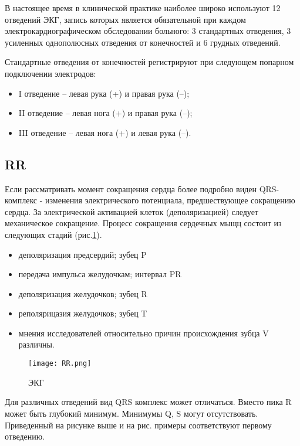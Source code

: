 В настоящее время в клинической практике наиболее широко используют 12 отведений ЭКГ, запись которых является обязательной при каждом электрокардиографическом обследовании больного: 3 стандартных отведения, 3 усиленных однополюсных отведения от конечностей и 6 грудных отведений.

Стандартные отведения от конечностей регистрируют при следующем попарном подключении электродов:

\begin{itemize}
	\item I отведение – левая рука (+) и правая рука (–);
	\item II отведение – левая нога (+) и правая рука (–);
	\item III отведение – левая нога (+) и левая рука (–).
\end{itemize}

\subsection{RR}
Если рассматривать момент сокращения сердца более подробно \cite{polarization_heart} виден QRS-комплекс - изменения электрического потенциала, предшествующее сокращению сердца. За электрической активацией клеток (деполяризацией) следует механическое сокращение. Процесс сокращения сердечных мыщц состоит из следующих стадий (рис.\ref{ris:RR}).

\begin{itemize}
	\item деполяризация предсердий; зубец P
	\item передача импульса желудочкам; интервал PR
	\item деполяризация желудочков; зубец R
	\item реполярицазия желудочков; зубец T
	\item мнения исследователей относительно причин происхождения зубца V различны.
\end{itemize}

\begin{figure}[h]
	\begin{center}
		\texttt{[image: RR.png]}
		\caption{ЭКГ}
		\label{ris:RR}
	\end{center}
\end{figure}

Для различных отведений вид QRS комплекс может отличаться. Вместо пика R может быть глубокий минимум. Минимумы Q, S могут отсутствовать. Приведенный на рисунке выше и на рис. примеры соответствуют первому отведению.

